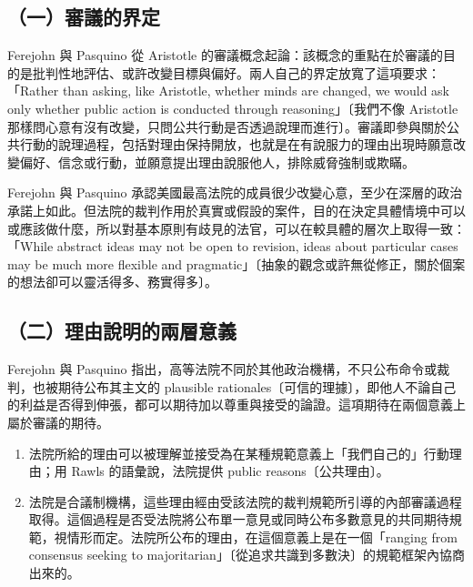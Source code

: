 \subsection{（一）審議的界定}

Ferejohn 與 Pasquino 從 Aristotle 的審議概念起論：該概念的重點在於審議的目的是批判性地評估、或許改變目標與偏好。兩人自己的界定放寬了這項要求：「Rather than asking, like Aristotle, whether minds are changed, we would ask only whether public action is conducted through reasoning」〔我們不像 Aristotle 那樣問心意有沒有改變，只問公共行動是否透過說理而進行〕。審議即參與關於公共行動的說理過程，包括對理由保持開放，也就是在有說服力的理由出現時願意改變偏好、信念或行動，並願意提出理由說服他人，排除威脅強制或欺瞞。

Ferejohn 與 Pasquino 承認美國最高法院的成員很少改變心意，至少在深層的政治承諾上如此。但法院的裁判作用於真實或假設的案件，目的在決定具體情境中可以或應該做什麼，所以對基本原則有歧見的法官，可以在較具體的層次上取得一致：「While abstract ideas may not be open to revision, ideas about particular cases may be much more flexible and pragmatic」〔抽象的觀念或許無從修正，關於個案的想法卻可以靈活得多、務實得多〕。

\subsection{（二）理由說明的兩層意義}

Ferejohn 與 Pasquino 指出，高等法院不同於其他政治機構，不只公布命令或裁判，也被期待公布其主文的 plausible rationales〔可信的理據〕，即他人不論自己的利益是否得到伸張，都可以期待加以尊重與接受的論證。這項期待在兩個意義上屬於審議的期待。

\begin{enumerate}
\def\labelenumi{\arabic{enumi}.}
\tightlist
\item
  法院所給的理由可以被理解並接受為在某種規範意義上「我們自己的」行動理由；用 Rawls 的語彙說，法院提供 public reasons〔公共理由〕。
\item
  法院是合議制機構，這些理由經由受該法院的裁判規範所引導的內部審議過程取得。這個過程是否受法院將公布單一意見或同時公布多數意見的共同期待規範，視情形而定。法院所公布的理由，在這個意義上是在一個「ranging from consensus seeking to majoritarian」〔從追求共識到多數決〕的規範框架內協商出來的。
\end{enumerate}


